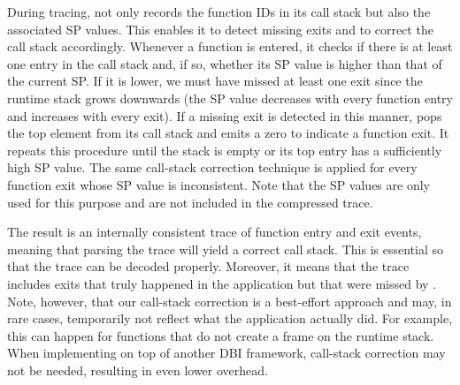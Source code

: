 During tracing, \parlot not only records the function IDs in its call stack but also the associated SP values. This enables it to detect missing exits and to correct the call stack accordingly. Whenever a function is entered, it checks if there is at least one entry in the call stack and, if so, whether its SP value is higher than that of the current SP. If it is lower, we must have missed at least one exit since the runtime stack grows downwards (the SP value decreases with every function entry and increases with every exit). If a missing exit is detected in this manner, \parlot pops the top element from its call stack and emits a zero to indicate a function exit. It repeats this procedure until the stack is empty or its top entry has a sufficiently high SP value. The same call-stack correction technique is applied for every function exit whose SP value is inconsistent. Note that the SP values are only used for this purpose and are not included in the compressed trace.

The result is an internally consistent trace of function entry and exit events, meaning that parsing the trace will yield a correct call stack. This is essential so that the trace can be decoded properly. Moreover, it means that the trace includes exits that truly happened in the application but that were missed by \pin. Note, however, that our call-stack correction is a best-effort approach and may, in rare cases, temporarily not reflect what the application actually did. For example, this can happen for functions that do not create a frame on the runtime stack. When implementing \parlot on top of another DBI framework, call-stack correction may not be needed, resulting in even lower \parlot overhead.
